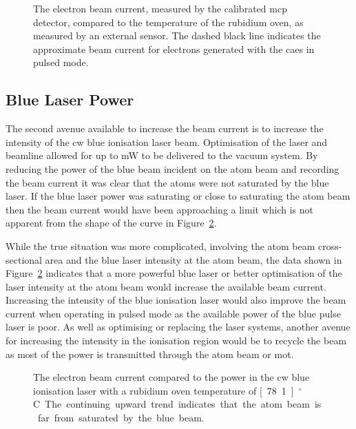 \begin{figure}
    \center
    
    \caption[Beam current and rubidium oven temperature.]{The electron beam current, measured by the calibrated \gls{mcp} detector, compared to the temperature of the rubidium oven, as measured by an external sensor.
    The dashed black line indicates the approximate beam current for electrons generated with the \gls{caes} in pulsed mode.}
    \label{figure:oven_counts}
\end{figure}

\subsection{Blue Laser Power}

The second avenue available to increase the beam current is to increase the intensity of the \gls{cw} blue ionisation laser beam.
Optimisation of the laser and beamline allowed for up to \unit[280]{mW} to be delivered to the vacuum system.
By reducing the power of the blue beam incident on the atom beam and recording the beam current it was clear that the atoms were not saturated by the blue laser.
If the blue laser power was saturating or close to saturating the atom beam then the beam current would have been approaching a limit which is not apparent from the shape of the curve in Figure~\ref{figure:blue_power}.

While the true situation was more complicated, involving the atom beam cross-sectional area and the blue laser intensity at the atom beam, the data shown in Figure~\ref{figure:blue_power} indicates that a more powerful blue laser or better optimisation of the laser intensity at the atom beam would increase the available beam current.
Increasing the intensity of the blue ionisation laser would also improve the beam current when operating in pulsed mode as the available power of the blue pulse laser is poor.
As well as optimising or replacing the laser systems, another avenue for increasing the intensity in the ionisation region would be to recycle the beam as most of the power is transmitted through the atom beam or \gls{mot}.

\begin{figure}
    \center
    
    \caption[Beam current and ionisation laser power.]{The electron beam current compared to the power in the \gls{cw} blue ionisation laser with a rubidium oven temperature of \unit[78.1]{$^\circ$C}.
    The continuing upward trend indicates that the atom beam is far from saturated by the blue beam.}
    \label{figure:blue_power}
\end{figure}

